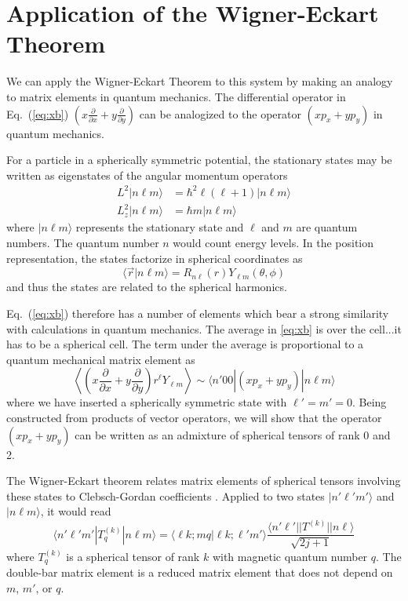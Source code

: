 \documentclass[preprint,12pt]{elsarticle}
\begin{document}
\section{Application of the Wigner-Eckart Theorem}

We can apply the Wigner-Eckart Theorem to this system by making an
analogy to matrix elements in quantum mechanics.  The differential
operator in Eq.~(\ref{eq:xb}) $\left(x\frac{\partial}{\partial
  x}+y\frac{\partial}{\partial y}\right)$ can be analogized to the
operator $(xp_x+yp_y)$ in quantum mechanics.

For a particle in a spherically symmetric potential, the stationary
states may be written as eigenstates of the angular momentum operators
\begin{align}
L^2|n\ell m\rangle&=\hbar^2\ell(\ell+1)|n\ell m\rangle\\
L_z^2|n\ell m\rangle&=\hbar m|n\ell m\rangle
\end{align}
where $|n\ell m\rangle$ represents the stationary state and $\ell$ and
$m$ are quantum numbers.  The quantum number $n$ would count energy
levels.  In the position representation, the states factorize in
spherical coordinates as
\begin{equation}
\langle\vec{r}|n\ell m\rangle=R_{n\ell}(r)Y_{\ell m}(\theta,\phi)
\end{equation}
and thus the states are related to the spherical harmonics.

Eq.~(\ref{eq:xb}) therefore has a number of elements which bear a
strong similarity with calculations in quantum mechanics.  The average
in \ref{eq:xb} is over the cell...it has to be a spherical cell.  The
term under the average is proportional to a quantum mechanical matrix
element as
\begin{equation}
\label{eq:matrix}
  \left\langle\left(x\frac{\partial}{\partial
  x}+y\frac{\partial}{\partial y}\right)r^\ell Y_{\ell
  m}\right\rangle\sim\langle n'00|(xp_x+yp_y)|n\ell m\rangle
\end{equation}
where we have inserted a spherically symmetric state with
$\ell'=m'=0$.  Being constructed from products of vector operators, we
will show that the operator $(xp_x+yp_y)$ can be written as an
admixture of spherical tensors of rank 0 and 2.

The Wigner-Eckart theorem relates matrix elements of spherical tensors
involving these states to Clebsch-Gordan coefficients
\cite{bib:sakurai}.  Applied to two states $|n'\ell'm'\rangle$ and
$|n\ell m\rangle$, it would read
\begin{equation}
\langle n'\ell'm'|T_q^{(k)}|n\ell m\rangle=\langle\ell k;mq|\ell k;\ell'm'\rangle\frac{\langle n'\ell'||T^{(k)}||n\ell\rangle}{\sqrt{2j+1}}
\end{equation}
where $T_q^{(k)}$ is a spherical tensor of rank $k$ with magnetic
quantum number $q$.  The double-bar matrix element is a reduced matrix
element that does not depend on $m$, $m'$, or $q$.
\end{document}
